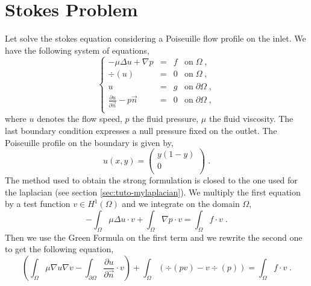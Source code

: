 %

\section{Stokes Problem}
\label{sec:tuto-mystokes}

Let solve the stokes equation considering a Poiseuille flow profile 
on the inlet. We have the following system of equations,
%
\begin{equation}
\left\{
\begin{array}{rcll}
-\mu\Delta u + \nabla p & = & f & \text{on}\; \Omega \;, \\
                \div(u) & = & 0 & \text{on}\; \Omega \;, \\
                     u  & = & g & \text{on}\; \partial\Omega \;, \\
 \frac{\partial u}{\partial \vec n} -p\vec n & = & 0 & \text{on}\; \partial\Omega \;, \\
\end{array}
\right.
\label{eq:tuto-stk}
\end{equation}
%
where $u$ denotes the flow speed, $p$ the fluid pressure, $\mu$ the 
fluid viscosity.
The last boundary condition expresses a null pressure fixed
on the outlet. The Poiseuille profile on the boundary is given by,
%
\begin{equation}
u(x,y) = \left(
         \begin{array}{c}
           y(1-y)\\
            0   \\
         \end{array}
         \right) \;.
\end{equation}
%
The method used to obtain the strong formulation is closed to the one used
for the laplacian (see section \ref{sec:tuto-mylaplacian}).
We multiply the first equation by a test function $v\in H^1(\Omega)$
and we integrate on the domain $\Omega$,
%
\begin{equation}
-\int_\Omega \mu \Delta u \cdot v
+\int_\Omega \nabla p \cdot v
=\int_\Omega f \cdot v \;.
\end{equation}
%
Then we use the Green Formula on the first term and we rewrite the second one 
to get the following equation,
%
\begin{equation}
\left(
\int_\Omega \mu \nabla u \nabla v
-\int_{\partial\Omega} \frac{\partial u}{\partial \vec n} \cdot v
\right)
+\int_\Omega ( \div(p v) - v \div(p) )
=\int_\Omega f \cdot v \;.
\label{eq:tuto-stk-1}
\end{equation}
